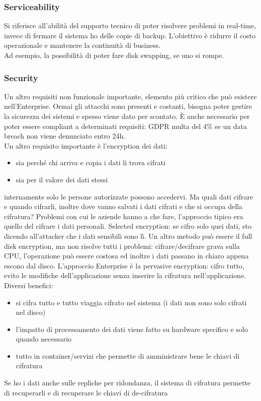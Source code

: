 \documentclass{article}
\begin{document}
\subsubsection{Serviceability}
Si riferisce all'abilità del supporto tecnico di poter risolvere problemi in real-time, invece di fermare il sistema ho delle copie di backup. L'obiettivo è ridurre il costo operazionale e mantenere la continuità di business.\\ Ad esempio, la possibilità di poter fare disk swapping, se uno si rompe.
\subsubsection{Security}
Un altro requisiti non funzionale importante, elemento più critico che può esistere nell'Enterprise. Ormai gli attacchi sono presenti e costanti, bisogna poter gestire la sicurezza dei sistemi e spesso viene dato per scontato. È anche necessario per poter essere compliant a determinati requisiti: GDPR multa del $4\%$ se un data breach non viene denunciato entro 24h.\\ Un altro requisito importante è l'encryption dei dati:
\begin{itemize}
\item sia perché chi arriva e copia i dati li trova cifrati
\item sia per il valore dei dati stessi
\end{itemize}
internamente solo le persone autorizzate possono accedervi. Ma quali dati cifrare e quando cifrarli, inoltre dove vanno salvati i dati cifrati e che si occupa della cifratura? Problemi con cui le aziende hanno a che fare, l'approccio tipico era quello del cifrare i dati personali. Selected encryption: se cifro solo quei dati, sto dicendo all'attacker che i dati sensibili sono lì. Un altro metodo può essere il full disk encryption, ma non risolve tutti i problemi: cifrare/decifrare grava sulla CPU, l'operazione può essere costosa ed inoltre i dati passano in chiaro appena escono dal disco. L'approccio Enterprise è la pervasive encryption: cifro tutto, evito le modifiche dell'applicazione senza inserire la cifratura nell'applicazione. Diversi benefici:
\begin{itemize}
\item si cifra tutto e tutto viaggia cifrato nel sistema (i dati non sono solo cifrati nel disco)
\item l'impatto di processamento dei dati viene fatto su hardware specifico e solo quando necessario
\item tutto in container/servizi che permette di amministrare bene le chiavi di cifratura
\end{itemize}
Se ho i dati anche sulle repliche per ridondanza, il sistema di cifratura permette di recuperarli e di recuperare le chiavi di de-cifratura
\end{document}
